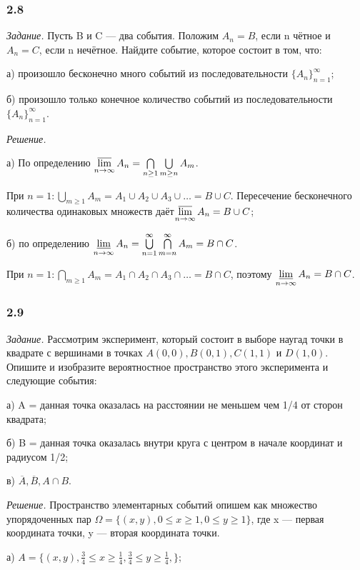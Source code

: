 \documentclass{book}
\begin{document}
\subsubsection*{2.8}

\textit{Задание.} Пусть B и C --- два события. Положим $A_n=B$, если n чётное и $A_n=C$, если n нечётное. Найдите событие, которое состоит в том, что:

а) произошло бесконечно много событий из последовательности $\{A_n\}_{n=1}^\infty$;

б) произошло только конечное количество событий из последовательности $\{A_n\}_{n=1}^\infty$.

\textit{Решение.}

а) По определению $\varlimsup\limits_{n\to\infty}A_n=\bigcap\limits_{n\geq 1}\bigcup\limits_{m\geq n}A_m$.

При $n=1: \bigcup\limits_{m\geq 1}A_m=A_1\cup A_2\cup A_3\cup \dotsc =B\cup C$. Пересечение бесконечного количества одинаковых множеств даёт$\varlimsup\limits_{n\to\infty}A_n=B\cup C$;

б) по определению $\varliminf\limits_{n\to\infty}A_n=\bigcup\limits_{n=1}^\infty\bigcap\limits_{m=n}^\infty A_m=B\cap C$.

При $n=1: \bigcap\limits_{m\geq 1}A_m=A_1\cap A_2\cap A_3\cap \dotsc =B\cap C$, поэтому $\varliminf\limits_{n\to\infty}A_n=B\cap C$.

\subsubsection*{2.9}

\textit{Задание.} Рассмотрим эксперимент, который состоит в выборе наугад точки в квадрате с вершинами в точках $A(0, 0), B(0, 1), C(1, 1)$ и $D(1, 0)$. Опишите и изобразите вероятностное пространство этого эксперимента и следующие события:

а) A = {данная точка оказалась на расстоянии не меньшем чем 1/4 от сторон квадрата};

б) B = {данная точка оказалась внутри круга с центром в начале координат и радиусом 1/2};

в) $\overline{A}, \overline{B}, A\cap B$.

\textit{Решение.} Пространство элементарных событий опишем как множество упорядоченных пар $\Omega=\{(x, y), 0\leq x\geq 1, 0\leq y\geq 1\}$, где x --- первая координата точки, y --- вторая координата точки.

а) $A=\{(x, y), \frac{3}{4}\leq x\geq\frac{1}{4}, \frac{3}{4}\leq y\geq\frac{1}{4}, \}$;
\end{document}
